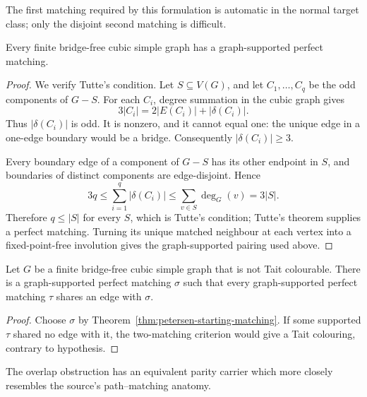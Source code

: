 The first matching required by this formulation is automatic in the normal
target class; only the disjoint second matching is difficult.

\begin{theorem}
\label{thm:petersen-starting-matching}
Every finite bridge-free cubic simple graph has a graph-supported perfect
matching.
\end{theorem}

\begin{proof}
We verify Tutte's condition.  Let \(S\subseteq V(G)\), and let
\(C_1,\ldots,C_q\) be the odd components of \(G-S\).  For each \(C_i\),
degree summation in the cubic graph gives
\[
  3|C_i|=2|E(C_i)|+|\delta(C_i)|.
\]
Thus \(|\delta(C_i)|\) is odd.  It is nonzero, and it cannot equal one:
the unique edge in a one-edge boundary would be a bridge.  Consequently
\(|\delta(C_i)|\geq 3\).

Every boundary edge of a component of \(G-S\) has its other endpoint in
\(S\), and boundaries of distinct components are edge-disjoint.  Hence
\[
  3q
  \leq \sum_{i=1}^{q}|\delta(C_i)|
  \leq \sum_{v\in S}\deg_G(v)
  =3|S|.
\]
Therefore \(q\leq |S|\) for every \(S\), which is Tutte's condition; Tutte's
theorem supplies a perfect matching.  Turning its unique matched neighbour at
each vertex into a fixed-point-free involution gives the graph-supported
pairing used above.
\end{proof}

\begin{corollary}
\label{cor:inhabited-overlap-family}
Let \(G\) be a finite bridge-free cubic simple graph that is not Tait
colourable.  There is a graph-supported perfect matching \(\sigma\) such that
every graph-supported perfect matching \(\tau\) shares an edge with \(\sigma\).
\end{corollary}

\begin{proof}
Choose \(\sigma\) by Theorem~\ref{thm:petersen-starting-matching}.  If some
supported \(\tau\) shared no edge with it, the two-matching criterion would
give a Tait colouring, contrary to hypothesis.
\end{proof}

The overlap obstruction has an equivalent parity carrier which more closely
resembles the source's path--matching anatomy.

